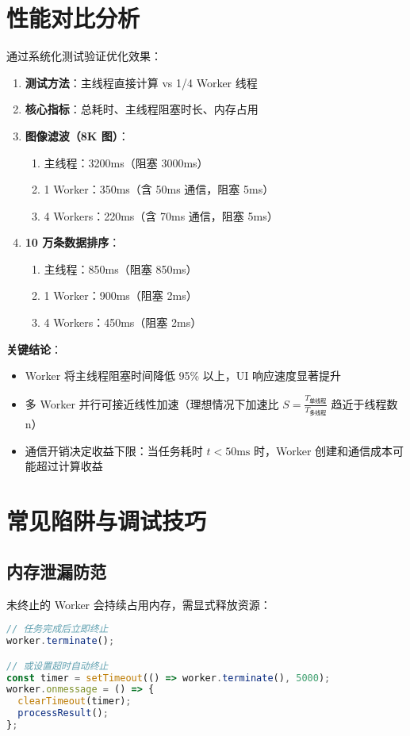 \chapter{性能对比分析}
通过系统化测试验证优化效果：\par
\begin{enumerate}
\item \textbf{测试方法}：主线程直接计算 vs 1/4 Worker 线程
\item \textbf{核心指标}：总耗时、主线程阻塞时长、内存占用
\item \textbf{图像滤波（8K 图）}：\begin{enumerate}
\item 主线程：3200ms（阻塞 3000ms）
\item 1 Worker：350ms（含 50ms 通信，阻塞 5ms）
\item 4 Workers：220ms（含 70ms 通信，阻塞 5ms）
\end{enumerate}

\item \textbf{10 万条数据排序}：\begin{enumerate}
\item 主线程：850ms（阻塞 850ms）
\item 1 Worker：900ms（阻塞 2ms）
\item 4 Workers：450ms（阻塞 2ms）
\end{enumerate}

\end{enumerate}
\textbf{关键结论}：\par
\begin{itemize}
\item Worker 将主线程阻塞时间降低 95\%{} 以上，UI 响应速度显著提升
\item 多 Worker 并行可接近线性加速（理想情况下加速比 $S = \frac{T_{\text{单线程}}}{T_{\text{多线程}}}$ 趋近于线程数 n）
\item 通信开销决定收益下限：当任务耗时 $t < 50\text{ms}$ 时，Worker 创建和通信成本可能超过计算收益
\end{itemize}
\chapter{常见陷阱与调试技巧}
\section{内存泄漏防范}
未终止的 Worker 会持续占用内存，需显式释放资源：\par
\begin{lstlisting}[language=javascript]
// 任务完成后立即终止
worker.terminate(); 

// 或设置超时自动终止
const timer = setTimeout(() => worker.terminate(), 5000);
worker.onmessage = () => { 
  clearTimeout(timer);
  processResult();
};
\end{lstlisting}
